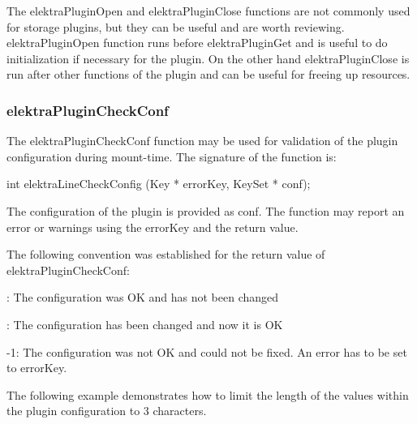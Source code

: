 The {\ttfamily elektra\+Plugin\+Open} and {\ttfamily elektra\+Plugin\+Close} functions are not commonly used for storage plugins, but they can be useful and are worth reviewing. {\ttfamily elektra\+Plugin\+Open} function runs before {\ttfamily elektra\+Plugin\+Get} and is useful to do initialization if necessary for the plugin. On the other hand {\ttfamily elektra\+Plugin\+Close} is run after other functions of the plugin and can be useful for freeing up resources.

\subsubsection*{{\ttfamily elektra\+Plugin\+Check\+Conf}}

The {\ttfamily elektra\+Plugin\+Check\+Conf} function may be used for validation of the plugin configuration during mount-\/time. The signature of the function is\+:


\begin{DoxyCode}
\textcolor{keywordtype}{int} elektraLineCheckConfig (Key * errorKey, KeySet * conf);
\end{DoxyCode}


The configuration of the plugin is provided as {\ttfamily conf}. The function may report an error or warnings using the {\ttfamily error\+Key} and the return value.

The following convention was established for the return value of {\ttfamily elektra\+Plugin\+Check\+Conf}\+:


\begin{DoxyItemize}
\item {}\+: The configuration was OK and has not been changed
\item {}\+: The configuration has been changed and now it is OK
\item {\ttfamily -\/1}\+: The configuration was not OK and could not be fixed. An error has to be set to error\+Key.
\end{DoxyItemize}

The following example demonstrates how to limit the length of the values within the plugin configuration to 3 characters.


